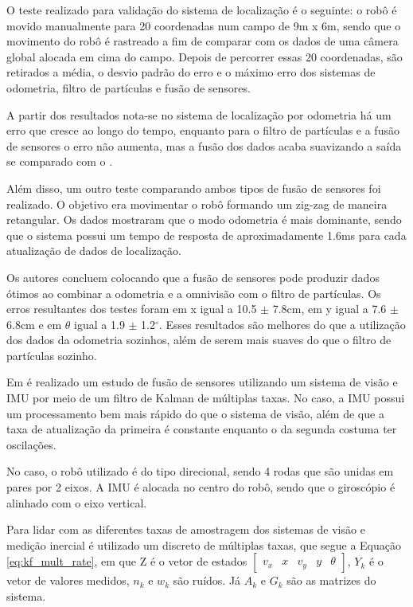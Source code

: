 \documentclass[acronym, symbols, table]{fei}
\begin{document}
	O teste realizado para validação do sistema de localização é o seguinte: o robô é movido manualmente para 20 coordenadas num campo de 9m x 6m, sendo que o movimento do robô é rastreado a fim de comparar com os dados de uma câmera global alocada em cima do campo. Depois de percorrer essas 20 coordenadas, são retirados a média, o desvio padrão do erro e o máximo erro dos sistemas de odometria, filtro de partículas e fusão de sensores.
	
	A partir dos resultados nota-se no sistema de localização por odometria há um erro que cresce ao longo do tempo, enquanto para o filtro de partículas e a fusão de sensores o erro não aumenta, mas a fusão dos dados acaba suavizando a saída se comparado com o .
	
	Além disso, um outro teste comparando ambos tipos de fusão de sensores foi realizado. O objetivo era movimentar o robô formando um zig-zag de maneira retangular. Os dados mostraram que o modo odometria é mais dominante, sendo que o sistema possui um tempo de resposta de aproximadamente 1.6ms para cada atualização de dados de localização.
	
	Os autores concluem colocando que a fusão de sensores pode produzir dados ótimos ao combinar a odometria e a omnivisão com o filtro de partículas. Os erros resultantes dos testes foram em x igual a 10.5 $\pm$ 7.8cm, em y igual a 7.6 $\pm$ 6.8cm e em $\theta$ igual a 1.9 $\pm$ 1.2$^\circ$. Esses resultados são melhores do que a utilização dos dados da odometria sozinhos, além de serem mais suaves do que o filtro de partículas sozinho.
	
	Em \textcite{10.1007/978-3-642-54734-8_23} é realizado um estudo de fusão de sensores utilizando um sistema de visão e IMU por meio de um filtro de Kalman de múltiplas taxas. No caso, a IMU possui um processamento bem mais rápido do que o sistema de visão, além de que a taxa de atualização da primeira é constante enquanto o da segunda costuma ter oscilações.
	
	No caso, o robô utilizado é do tipo direcional, sendo 4 rodas que são unidas em pares por 2 eixos. A IMU é alocada no centro do robô, sendo que o giroscópio é alinhado com o eixo vertical.
	
	Para lidar com as diferentes taxas de amostragem dos sistemas de visão e medição inercial é utilizado um  discreto de múltiplas taxas, que segue a Equação \ref{eq:kf_mult_rate}, em que Z é o vetor de estados $\begin{bmatrix} v_x & x & v_y & y & \theta \end{bmatrix}$, $Y_k$ é o vetor de valores medidos, $n_k$ e $w_k$ são ruídos. Já $A_k$ e $G_k$ são as matrizes do sistema.
	
\end{document}
